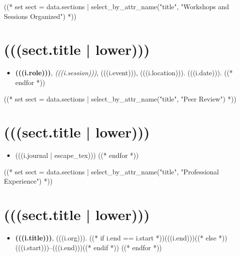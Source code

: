 \documentclass[10pt,oneside]{article}
\begin{document}
((* set sect = data.sections | select_by_attr_name("title", "Workshops and Sessions Organized") *))
\section{\color{BrickRed}(((sect.title | lower)))}

\mbox{}\vspace{-\dimexpr\baselineskip\relax}

\begin{itemize}[label={}]
  ((* for i in sect.entries.convene | sort(attribute="date", reverse=True) *))
  \item \textbf{(((i.role)))}, \textit{(((i.session)))}, (((i.event))), (((i.location))). (((i.date))).
        ((* endfor *))
\end{itemize}

((* set sect = data.sections | select_by_attr_name("title", "Peer Review") *))
\section{\color{BrickRed}(((sect.title | lower)))}

\mbox{}\vspace{-\dimexpr\baselineskip\relax}

\begin{itemize}[label={}]
  ((* for i in sect.entries.peerreview | sort(attribute="journal") *))
  \item (((i.journal | escape_tex)))
        ((* endfor *))
\end{itemize}

((* set sect = data.sections | select_by_attr_name("title", "Professional Experience") *))
\section{\color{BrickRed}(((sect.title | lower)))}

\mbox{}\vspace{-\dimexpr\baselineskip\relax}

\begin{itemize}[label={}]
  ((* for i in sect.entries.experience | sort_by_attr(["end", "start"], reverse=True) *))
  \item \textbf{(((i.title)))}, (((i.org))). ((* if i.end == i.start *))(((i.end)))((* else *))(((i.start)))--(((i.end)))((* endif *))
        ((* endfor *))
\end{itemize}
\end{document}

